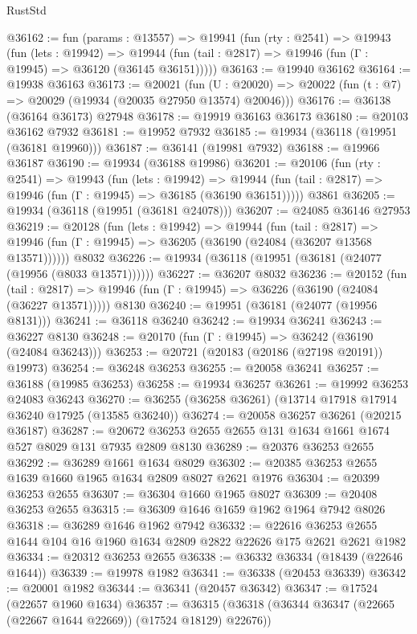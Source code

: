 \begin{lexlean}{RustStd}
\begin{coremodule}
@36162 := fun (params : @13557) =>
  @19941
    (fun (rty : @2541) =>
    @19943
      (fun (lets : @19942) =>
      @19944 (fun (tail : @2817) => @19946 (fun (Γ : @19945) => @36120 (@36145 @36151)))))
@36163 := @19940 @36162
@36164 := @19938 @36163
@36173 := @20021
    (fun (U : @20020) => @20022 (fun (t : @7) => @20029 (@19934 (@20035 @27950 @13574) @20046)))
@36176 := @36138 (@36164 @36173) @27948
@36178 := @19919 @36163 @36173
@36180 := @20103 @36162 @7932
@36181 := @19952 @7932
@36185 := @19934 (@36118 (@19951 (@36181 @19960)))
@36187 := @36141 (@19981 @7932)
@36188 := @19966 @36187
@36190 := @19934 (@36188 @19986)
@36201 := @20106
    (fun (rty : @2541) =>
    @19943
      (fun (lets : @19942) =>
      @19944 (fun (tail : @2817) => @19946 (fun (Γ : @19945) => @36185 (@36190 @36151)))))
    @3861
@36205 := @19934 (@36118 (@19951 (@36181 @24078)))
@36207 := @24085 @36146 @27953
@36219 := @20128
    (fun (lets : @19942) =>
    @19944
      (fun (tail : @2817) =>
      @19946 (fun (Γ : @19945) => @36205 (@36190 (@24084 (@36207 @13568 @13571))))))
    @8032
@36226 := @19934 (@36118 (@19951 (@36181 (@24077 (@19956 (@8033 @13571))))))
@36227 := @36207 @8032
@36236 := @20152
    (fun (tail : @2817) => @19946 (fun (Γ : @19945) => @36226 (@36190 (@24084 (@36227 @13571)))))
    @8130
@36240 := @19951 (@36181 (@24077 (@19956 @8131)))
@36241 := @36118 @36240
@36242 := @19934 @36241
@36243 := @36227 @8130
@36248 := @20170 (fun (Γ : @19945) => @36242 (@36190 (@24084 @36243)))
@36253 := @20721 (@20183 (@20186 (@27198 @20191)) @19973)
@36254 := @36248 @36253
@36255 := @20058 @36241
@36257 := @36188 (@19985 @36253)
@36258 := @19934 @36257
@36261 := @19992 @36253 @24083 @36243
@36270 := @36255 (@36258 @36261) (@13714 @17918 @17914 @36240 @17925 (@13585 @36240))
@36274 := @20058 @36257 @36261 (@20215 @36187)
@36287 := @20672 @36253 @2655 @2655 @131 @1634 @1661 @1674 @527 @8029 @131 @7935 @2809 @8130
@36289 := @20376 @36253 @2655
@36292 := @36289 @1661 @1634 @8029
@36302 := @20385 @36253 @2655 @1639 @1660 @1965 @1634 @2809 @8027 @2621 @1976
@36304 := @20399 @36253 @2655
@36307 := @36304 @1660 @1965 @8027
@36309 := @20408 @36253 @2655
@36315 := @36309 @1646 @1659 @1962 @1964 @7942 @8026
@36318 := @36289 @1646 @1962 @7942
@36332 := @22616 @36253 @2655 @1644 @104 @16 @1960 @1634 @2809 @2822 @22626 @175 @2621 @2621 @1982
@36334 := @20312 @36253 @2655
@36338 := @36332 @36334 (@18439 (@22646 @1644))
@36339 := @19978 @1982
@36341 := @36338 (@20453 @36339)
@36342 := @20001 @1982
@36344 := @36341 (@20457 @36342)
@36347 := @17524 (@22657 @1960 @1634)
@36357 := @36315 (@36318 (@36344 @36347 (@22665 (@22667 @1644 @22669)) (@17524 @18129) @22676))

\end{coremodule}
\end{lexlean}
